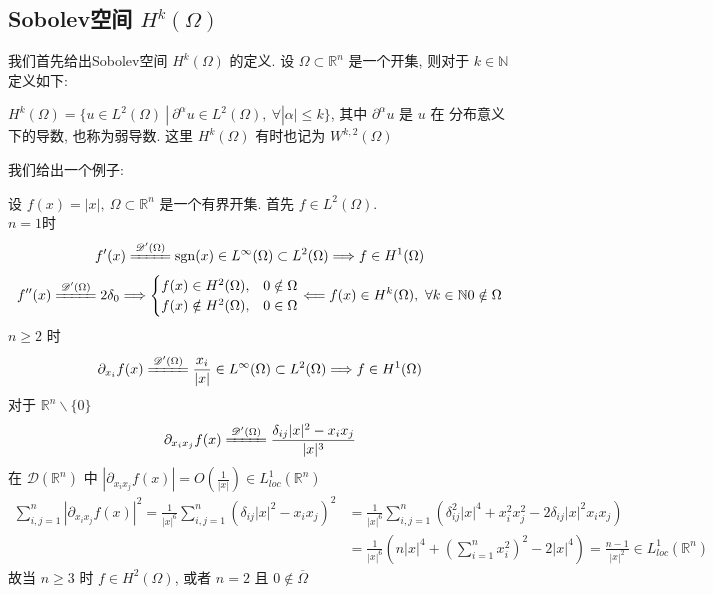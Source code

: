 \documentclass[11pt]{ctexart}[UTF8]
\begin{document}
\subsection{Sobolev空间 $H^{k}(\Omega)$}
我们首先给出Sobolev空间 $H^{k}(\Omega)$ 的定义. 设 $\Omega \subset \mathbb{R}^{n}$ 是一个开集, 则对于 $k \in \mathbb{N}$ 定义如下:
\begin{theorem}
    $H^{k}(\Omega) = \{ u \in L^{2}(\Omega)\ |\ \partial^{\alpha}u \in L^{2}(\Omega),\ \forall |\alpha| \leq k \}$, 其中 $\partial^{\alpha}u$ 是 $u$ 在
    分布意义下的导数, 也称为弱导数. 这里 $H^{k}(\Omega)$ 有时也记为 $W^{k,2}(\Omega)$
\end{theorem}
我们给出一个例子:
\begin{example}
    设 $f(x) = |x|,\ \Omega \subset \mathbb{R}^n$ 是一个有界开集. 首先 $f \in L^{2}(\Omega)$.\\
    $n=1$时
    \begin{equation*}
        f'(x) \xlongequal{\mathscr{D}'(\Omega)}\operatorname{sgn}(x) \in L^{\infty}(\Omega) \subset L^{2}(\Omega) \Longrightarrow f \in H^{1}(\Omega)
    \end{equation*}
    \begin{equation*}
        f''(x) \xlongequal{\mathscr{D}'(\Omega)} 2\delta_{0} \Longrightarrow \begin{cases}
            f(x) \in H^{2}(\Omega), & 0 \notin \Omega\\
            f(x) \notin H^{2}(\Omega), & 0 \in \Omega
        \end{cases}
        \Longleftarrow f(x) \in H^{k}(\Omega),\ \forall k \in \mathbb{N} 0 \notin \Omega
    \end{equation*}
    $n\geq 2$ 时
    \begin{equation*}
        \partial_{x_{i}}f(x) \xlongequal{\mathscr{D}'(\Omega)}\frac{x_{i}}{|x|} \in L^{\infty}(\Omega) \subset L^{2}(\Omega) \Longrightarrow f \in H^{1}(\Omega)
    \end{equation*}
    对于 $\mathbb{R}^{n}\backslash\{0\}$
    \begin{equation*}
        \partial_{x_{i}x_{j}}f(x) \xlongequal{\mathscr{D}'(\Omega)}\frac{\delta_{ij}|x|^2 - x_{i}x_{j}}{|x|^3} 
    \end{equation*} 
    在 $\mathscr{D}(\mathbb{R}^{n})$ 中 $|\partial_{x_{i}x_{j}}f(x)| = O(\frac{1}{|x|}) \in L_{loc}^{1}(\mathbb{R}^{n})$
    \begin{equation*}
        \begin{aligned}
            \sum_{i,j=1}^{n}|\partial_{x_{i}x_{j}}f(x)|^2 = \frac{1}{|x|^6}\sum_{i,j=1}^{n}(\delta_{ij}|x|^2 - x_{i}x_{j})^2 &= \frac{1}{|x|^6}\sum_{i,j=1}^{n}(\delta_{ij}^2|x|^4 + x_{i}^2x_{j}^2 - 2\delta_{ij}|x|^2 x_{i}x_{j})\\
            &= \frac{1}{|x|^6}\left( n|x|^4 + \left(\sum_{i=1}^{n} x_{i}^2\right)^2 - 2|x|^4 \right) = \frac{n-1}{|x|^2} \in L_{loc}^{1}(\mathbb{R}^{n})
        \end{aligned}
    \end{equation*}
    故当 $n \geq 3$ 时 $f \in H^{2}(\Omega)$, 或者 $n=2$ 且 $0 \notin \overline{\Omega}$
\end{example}
\end{document}
